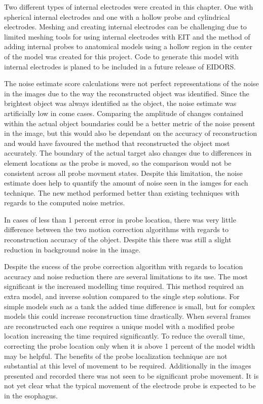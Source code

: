 Two different types of internal electrodes were created in this chapter. One with
spherical internal electrodes and one with a hollow probe and cylindrical electrodes. 
Meshing and creating internal electrodes can be challenging due to limited meshing tools 
for using internal electrodes with EIT and the method of adding internal probes to
anatomical models using a hollow region in the center of the model was created for this 
project. Code to generate this model with internal electrodes is planed to be included in a
future release of EIDORS.

The noise estimate score calculations were not perfect representations of the noise
in the images due to the way the reconstructed object was identified.  Since the
brightest object was always identified as the object, the noise estimate was
artificially low in come cases. 
Comparing the amplitude of changes contained within the actual
object boundaries could be a better metric of the noise present in the image, but this
would also be dependant on the accuracy of reconstruction and would have favoured
the method that reconstructed the object most accurately.
The boundary of the actual target
also changes due to differences in element locations as the 
probe is moved, so the comparison would not be consistent across all probe movment
states. Despite this limitation, the noise estimate does help to quantify 
the amount of noise seen in the iamges for each technique. 
The new
method performed better than existing techniques with regards to the computed
noise metrics.

In cases of less than 1 percent error in probe location, there was very little 
difference between 
the two motion correction algorithms with regards to 
reconstruction accuracy of the object. Despite this there was still a slight reduction 
in background noise in the image. 

Despite the sucess of the probe correction algorithm with regards to location accuracy 
and noise reduction there are several limitations to its use. The most significant is 
the increased modelling time required. This method required an extra model, and inverse 
solution compared to the single step solutions. For simple models such as 
a tank the added time difference
is small, but for complex models this could increase reconstruction time drastically. 
When several frames are reconstructed each one requires a unique model 
with a modified probe location increasing the time required significantly. 
To reduce the overall time, correcting the probe location only when it is above 1
percent of the model width may be helpful. The benefits of 
the probe localization technique are 
not substantial at this level of movement to be required. 
Additionally in the images presented and recorded there was not seen to be significant
probe movement. It is not yet clear what the typical movement of the electrode probe 
is expected to be in the esophagus. 

